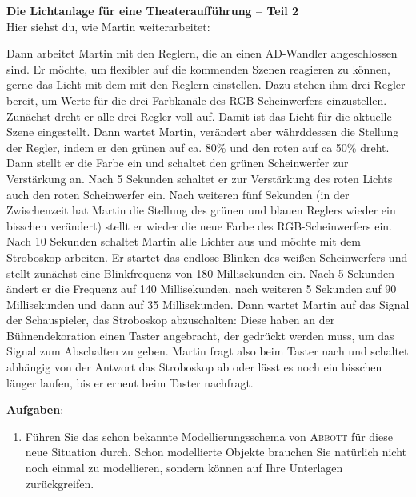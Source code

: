 \documentclass[11pt, a4paper]{article}
\begin{document}
\pagestyle{empty}
\textbf{{\Large Die Lichtanlage für eine Theateraufführung -- Teil 2}}\\

Hier siehst du, wie Martin weiterarbeitet:

\begin{mdframed}
Dann arbeitet Martin mit den Reglern, die an einen AD-Wandler angeschlossen sind. Er möchte, um flexibler auf die kommenden Szenen reagieren zu können, gerne das Licht mit dem mit den Reglern einstellen. Dazu stehen ihm drei Regler bereit, um Werte für die drei Farbkanäle des RGB-Scheinwerfers einzustellen.\\

Zunächst dreht er alle drei Regler voll auf. Damit ist das Licht für die aktuelle Szene eingestellt. Dann wartet Martin, verändert aber währddessen die Stellung der Regler, indem er den grünen auf ca. 80\% und den roten auf ca 50\% dreht. Dann stellt er die Farbe ein und schaltet den grünen Scheinwerfer zur Verstärkung an. Nach 5 Sekunden schaltet er zur Verstärkung des roten Lichts auch den roten Scheinwerfer ein. Nach weiteren fünf Sekunden (in der Zwischenzeit hat Martin die Stellung des grünen und blauen Reglers wieder ein bisschen verändert) stellt er wieder die neue Farbe des RGB-Scheinwerfers ein.\\

Nach 10 Sekunden schaltet Martin alle Lichter aus und möchte mit dem Stroboskop arbeiten. Er startet das endlose Blinken des weißen Scheinwerfers und stellt zunächst eine Blinkfrequenz von 180 Millisekunden ein. Nach 5 Sekunden ändert er die Frequenz auf 140 Millisekunden, nach weiteren 5 Sekunden auf 90 Millisekunden und dann auf 35 Millisekunden. Dann wartet Martin auf das Signal der Schauspieler, das Stroboskop abzuschalten: Diese haben an der Bühnendekoration einen Taster angebracht, der gedrückt werden muss, um das Signal zum Abschalten zu geben. Martin fragt also beim Taster nach und schaltet abhängig von der Antwort das Stroboskop ab oder lässt es noch ein bisschen länger laufen, bis er erneut beim Taster  nachfragt.
\end{mdframed}

\vfill
\textbf{Aufgaben}:
\begin{enumerate}
\item Führen Sie das schon bekannte Modellierungsschema von \textsc{Abbott} für diese neue Situation durch. Schon modellierte Objekte brauchen Sie natürlich nicht noch einmal zu modellieren, sondern können auf Ihre Unterlagen zurückgreifen.
\end{enumerate}
\end{document}
